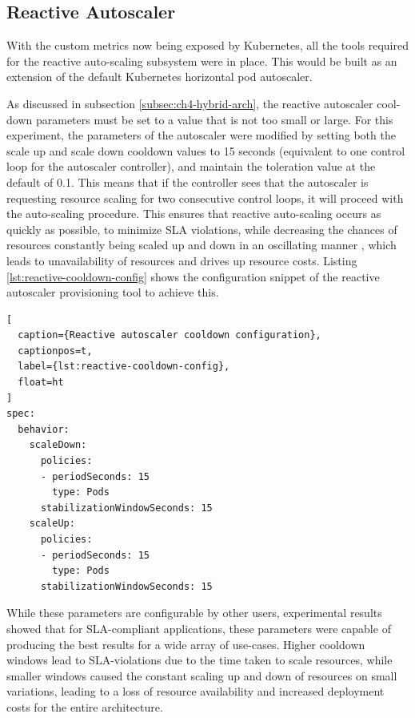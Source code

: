 \subsection{Reactive Autoscaler}
\label{subsec:reactive-auto-subsection}

With the custom metrics now being exposed by Kubernetes, all the tools required for the reactive auto-scaling subsystem were in place. This would be built as an extension of the default Kubernetes horizontal pod autoscaler.\par

As discussed in subsection \ref{subsec:ch4-hybrid-arch}, the reactive autoscaler cool-down parameters must be set to a value that is not too small or large. For this experiment, the parameters of the autoscaler were modified by setting both the scale up and scale down cooldown values to 15 seconds (equivalent to one control loop for the autoscaler controller), and maintain the toleration value at the default of 0.1. This means that if the controller sees that the autoscaler is requesting resource scaling for two consecutive control loops, it will proceed with the auto-scaling procedure. This ensures that reactive auto-scaling occurs as quickly as possible, to minimize SLA violations, while decreasing the chances of resources constantly being scaled up and down in an oscillating manner \cite{sides2015yo}, which leads to unavailability of resources and drives up resource costs. Listing \ref{lst:reactive-cooldown-config} shows the configuration snippet of the reactive autoscaler provisioning tool to achieve this.\par

\begin{lstlisting}[
  caption={Reactive autoscaler cooldown configuration},
  captionpos=t,
  label={lst:reactive-cooldown-config},
  float=ht
]
spec:
  behavior:
    scaleDown:
      policies:
      - periodSeconds: 15
        type: Pods
      stabilizationWindowSeconds: 15
    scaleUp:
      policies:
      - periodSeconds: 15
        type: Pods
      stabilizationWindowSeconds: 15
\end{lstlisting}

While these parameters are configurable by other users, experimental results showed that for SLA-compliant applications, these parameters were capable of producing the best results for a wide array of use-cases. Higher cooldown windows lead to SLA-violations due to the time taken to scale resources, while smaller windows caused the constant scaling up and down of resources on small variations, leading to a loss of resource availability and increased deployment costs for the entire architecture.

